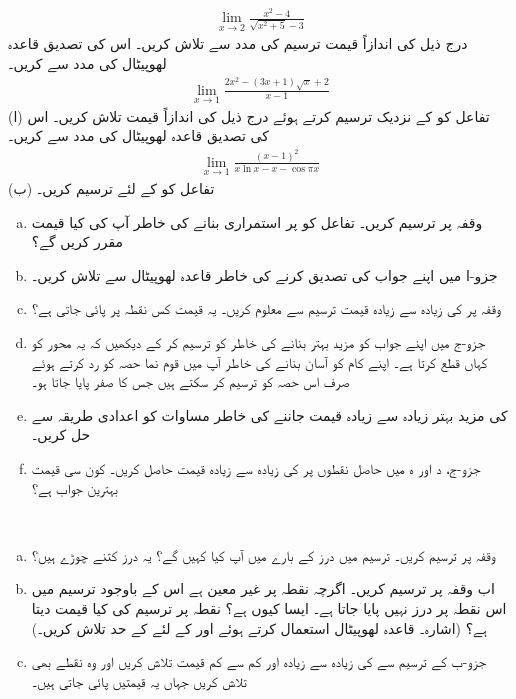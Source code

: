 \begin{align*}
\lim_{x\to2}\frac{x^2-4}{\sqrt{x^2+5}-3}
\end{align*} 
درج ذیل کی اندازاً قیمت ترسیم کی مدد سے تلاش کریں۔ اس کی تصدیق قاعدہ لھوپیٹال کی مدد سے کریں۔
\begin{align*}
\lim_{x\to1}\frac{2x^2-(3x+1)\sqrt{x}+2}{x-1}
\end{align*} 
(ا) تفاعل    کو  کے نزدیک ترسیم کرتے ہوئے درج ذیل کی اندازاً قیمت تلاش کریں۔ اس کی تصدیق قاعدہ لھوپیٹال کی مدد سے کریں۔
\begin{align*}
\lim_{x\to1}\frac{(x-1)^2}{x\ln x-x-\cos \pi x}
\end{align*} 
(ب) تفاعل  کو  کے لئے ترسیم کریں۔
\\
\begin{enumerate}[a.]
\item
وقفہ  پر  ترسیم کریں۔ تفاعل  کو  پر استمراری بنانے کی خاطر آپ  کی کیا قیمت مقرر کریں گے؟ 
\item
جزو-ا میں اپنے جواب کی تصدیق کرنے کی خاطر قاعدہ لھوپیٹال سے  تلاش کریں۔
\item
وقفہ  پر  کی زیادہ سے زیادہ قیمت ترسیم سے معلوم کریں۔ یہ قیمت کس نقطہ پر پائی جاتی ہے؟
\item
جزو-ج میں اپنے جواب کو مزید بہتر بنانے کی خاطر  کو ترسیم کر کے دیکھیں کہ یہ محور  کو کہاں قطع کرتا ہے۔ اپنے کام کو آسان بنانے کی خاطر آپ  میں قوم نما حصہ کو رد کرتے ہوئے صرف اس حصہ کو ترسیم کر سکتے ہیں جس کا صفر پایا جاتا ہو۔
\item
{} کی مزید بہتر زیادہ سے زیادہ قیمت جاننے کی خاطر مساوات  کو اعدادی طریقہ سے حل کریں۔
\item
جزو-ج، د اور ہ میں حاصل نقطوں پر  کی زیادہ سے زیادہ قیمت  حاصل کریں۔ کون سی قیمت بہترین جواب ہے؟
\end{enumerate}
\\
\begin{enumerate}[a.]
\item
وقفہ  پر  ترسیم کریں۔ ترسیم میں درز کے بارے میں آپ کیا کہیں گے؟ یہ درز کتنے چوڑے ہیں؟
\item
اب وقفہ  پر  ترسیم کریں۔ اگرچہ نقطہ  پر  غیر معین ہے اس کے باوجود ترسیم میں اس نقطہ پر درز نہیں پایا جاتا ہے۔ ایسا کیوں ہے؟ نقطہ  پر ترسیم  کی کیا قیمت دیتا ہے؟ (اشارہ۔ قاعدہ لھوپیٹال استعمال کرتے ہوئے  اور  کے لئے  کے حد تلاش کریں۔)
\item
جزو-ب کے ترسیم سے  کی زیادہ سے زیادہ اور کم سے کم قیمت تلاش کریں اور وہ نقطے بھی تلاش کریں جہاں یہ قیمتیں پائی جاتی ہیں۔
\end{enumerate}
